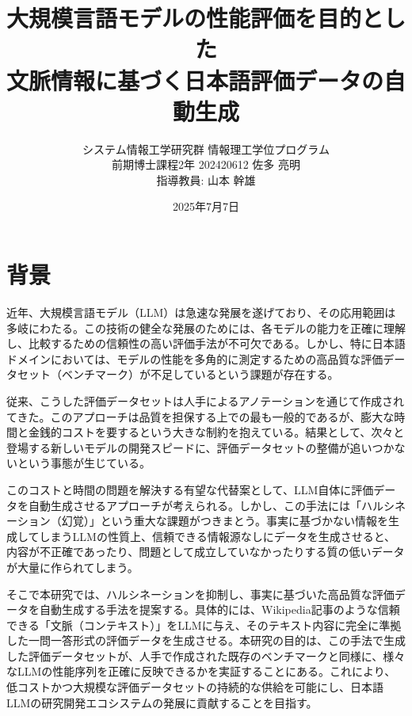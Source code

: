 \documentclass[twocolumn]{jsarticle}
\begin{document}
\title{\vspace{-3cm}大規模言語モデルの性能評価を目的とした\\
文脈情報に基づく日本語評価データの自動生成}
\author{
  システム情報工学研究群 情報理工学位プログラム\\
  前期博士課程2年 202420612 佐多 亮明\\
  指導教員: 山本 幹雄
}
\date{2025年7月7日}
\maketitle



\section{背景}
近年、大規模言語モデル（LLM）\cite{survey}は急速な発展を遂げており、その応用範囲は多岐にわたる。この技術の健全な発展のためには、各モデルの能力を正確に理解し、比較するための信頼性の高い評価手法が不可欠である。しかし、特に日本語ドメインにおいては、モデルの性能を多角的に測定するための高品質な評価データセット（ベンチマーク）が不足しているという課題が存在する。

従来、こうした評価データセットは人手によるアノテーションを通じて作成されてきた。このアプローチは品質を担保する上での最も一般的であるが、膨大な時間と金銭的コストを要するという大きな制約を抱えている。結果として、次々と登場する新しいモデルの開発スピードに、評価データセットの整備が追いつかないという事態が生じている。

このコストと時間の問題を解決する有望な代替案として、LLM自体に評価データを自動生成させるアプローチが考えられる。しかし、この手法には「ハルシネーション（幻覚）\cite{survey}」という重大な課題がつきまとう。事実に基づかない情報を生成してしまうLLMの性質上、信頼できる情報源なしにデータを生成させると、内容が不正確であったり、問題として成立していなかったりする質の低いデータが大量に作られてしまう。

そこで本研究では、ハルシネーションを抑制し、事実に基づいた高品質な評価データを自動生成する手法を提案する。具体的には、Wikipedia記事のような信頼できる「文脈（コンテキスト）」をLLMに与え、そのテキスト内容に完全に準拠した一問一答形式の評価データを生成させる。本研究の目的は、この手法で生成した評価データセットが、人手で作成された既存のベンチマークと同様に、様々なLLMの性能序列を正確に反映できるかを実証することにある。これにより、低コストかつ大規模な評価データセットの持続的な供給を可能にし、日本語LLMの研究開発エコシステムの発展に貢献することを目指す。
\end{document}
